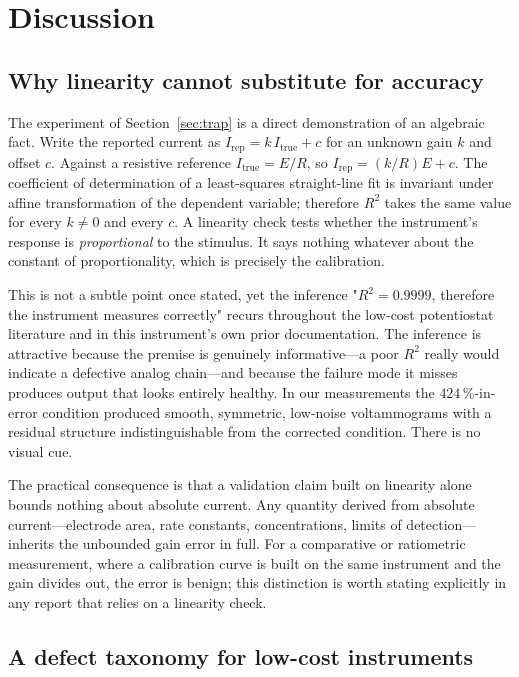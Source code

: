 \section{Discussion}
\label{sec:discussion}

\subsection{Why linearity cannot substitute for accuracy}
\label{sec:why}

The experiment of Section~\ref{sec:trap} is a direct demonstration of an
algebraic fact. Write the reported current as $I_{\mathrm{rep}} = k\,
I_{\mathrm{true}} + c$ for an unknown gain $k$ and offset $c$. Against a
resistive reference $I_{\mathrm{true}} = E/R$, so
$I_{\mathrm{rep}} = (k/R)E + c$. The coefficient of determination of a
least-squares straight-line fit is invariant under affine transformation of the
dependent variable; therefore $R^2$ takes the same value for every $k \neq 0$
and every $c$. A linearity check tests whether the instrument's response is
\emph{proportional} to the stimulus. It says nothing whatever about the
constant of proportionality, which is precisely the calibration.

This is not a subtle point once stated, yet the inference "$R^2 = 0.9999$,
therefore the instrument measures correctly" recurs throughout the low-cost
potentiostat literature and in this instrument's own prior documentation. The
inference is attractive because the premise is genuinely informative---a poor
$R^2$ really would indicate a defective analog chain---and because the failure
mode it misses produces output that looks entirely healthy. In our measurements
the $424\,\%$-in-error condition produced smooth, symmetric, low-noise
voltammograms with a residual structure indistinguishable from the corrected
condition. There is no visual cue.

The practical consequence is that a validation claim built on linearity alone
bounds nothing about absolute current. Any quantity derived from absolute
current---electrode area, rate constants, concentrations, limits of
detection---inherits the unbounded gain error in full. For a comparative or
ratiometric measurement, where a calibration curve is built on the same
instrument and the gain divides out, the error is benign; this distinction is
worth stating explicitly in any report that relies on a linearity check.

\subsection{A defect taxonomy for low-cost instruments}
\label{sec:taxonomy}

